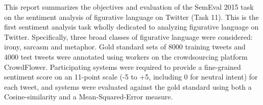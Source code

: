 This report summarizes the objectives and evaluation of the SemEval 2015 task on the sentiment analysis of figurative language on Twitter (Task 11). This is the first sentiment analysis task wholly dedicated to analyzing figurative language on Twitter. Specifically, three broad classes of figurative language were considered: irony, sarcasm and metaphor. Gold standard sets of 8000 training tweets and 4000 test tweets were annotated using workers on the crowdsourcing platform CrowdFlower. Participating systems were required to provide a fine-grained sentiment score on an 11-point scale (-5 to +5, including 0 for neutral intent) for each tweet, and systems were evaluated against the gold standard using both a Cosine-similarity and a Mean-Squared-Error measure.
